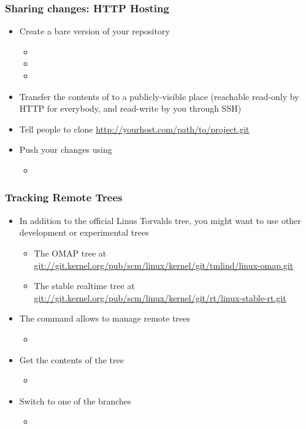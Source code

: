 \begin{frame}
  \frametitle{Sharing changes: HTTP Hosting}
  \begin{itemize}
  \item Create a bare version of your repository
    \begin{itemize}
    \item {}
    \item {}
    \item {}
    \end{itemize}
  \item Transfer the contents of  to a
    publicly-visible place (reachable read-only by HTTP for everybody,
    and read-write by you through SSH)
  \item Tell people to clone
    \url{http://yourhost.com/path/to/project.git}
  \item Push your changes using
    \begin{itemize}
    \item
    \end{itemize}
  \end{itemize}
\end{frame}

\begin{frame}
  \frametitle{Tracking Remote Trees}
  \begin{itemize}
  \item In addition to the official Linus Torvalds tree, you might
    want to use other development or experimental trees
    \begin{itemize}
    \item The OMAP tree at
      \url{git://git.kernel.org/pub/scm/linux/kernel/git/tmlind/linux-omap.git}
    \item The stable realtime tree at
      \url{git://git.kernel.org/pub/scm/linux/kernel/git/rt/linux-stable-rt.git}
    \end{itemize}
  \item The  command allows to manage remote trees
    \begin{itemize}
    \item
    \end{itemize}
  \item Get the contents of the tree
    \begin{itemize}
    \item {}
    \end{itemize}
  \item Switch to one of the branches
    \begin{itemize}
    \item {}
    \end{itemize}
  \end{itemize}
\end{frame}

